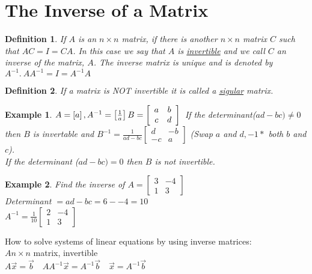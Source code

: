 \documentclass[a4paper,12pt,openany]{book}
\theoremstyle{defn}
\newtheorem{defn}{Definition}[section]
\theoremstyle{expl}
\newtheorem{expl}{Example}[section]
\begin{document}
\section{The Inverse of a Matrix}
\begin{defn}
\textup{If $A$ is an $n\times n$ matrix, if there is another $n\times n$ matrix $C$ such that $AC=I=CA$. In this case we say that $A$ is \underline{invertible} and we call $C$ an inverse of the matrix, $A$. The inverse matrix is unique and is denoted by $A^{-1}.~ AA^{-1}=I=A^{-1}A$}
\end{defn}
\begin{defn}
\textup{If a matrix is NOT invertible it is called a \underline{sigular} matrix.}
\end{defn}
\begin{expl}
$A=\left[a\right], A^{-1}=\left[\frac{1}{a}\right]\\
B=\left[\begin{array}{cc}a&b\\c&d\end{array}\right]\\$
\textup{If the determinant($ad-bc)\neq 0$ then $B$ is invertable and $B^{-1}=\frac{1}{ad-bc}\left[\begin{array}{cc}d&-b\\-c&a\end{array}\right]$ (Swap $a$ and $d, -1*$ both $b$ and $c$).\\
If the determinant ($ad-bc)=0$ then $B$ is not invertible.}
\end{expl}
\begin{expl}\textup{Find the inverse of $A=\left[\begin{array}{cc}3&-4\\1&3\end{array}\right]$\\
Determinant $=ad-bc=6--4=10$}\\
$A^{-1}=\frac{1}{10}\left[\begin{array}{cc}2&-4\\1&3\end{array}\right]$
\end{expl}
\noindent How to solve systems of linear equations by using inverse matrices:\\
$A n\times n$ matrix, invertible\\
$A\vec{x}=\vec{b}\quad AA^{-1}\vec{x}=A^{-1}\vec{b} \quad \vec{x}=A^{-1}\vec{b}$
\end{document}
